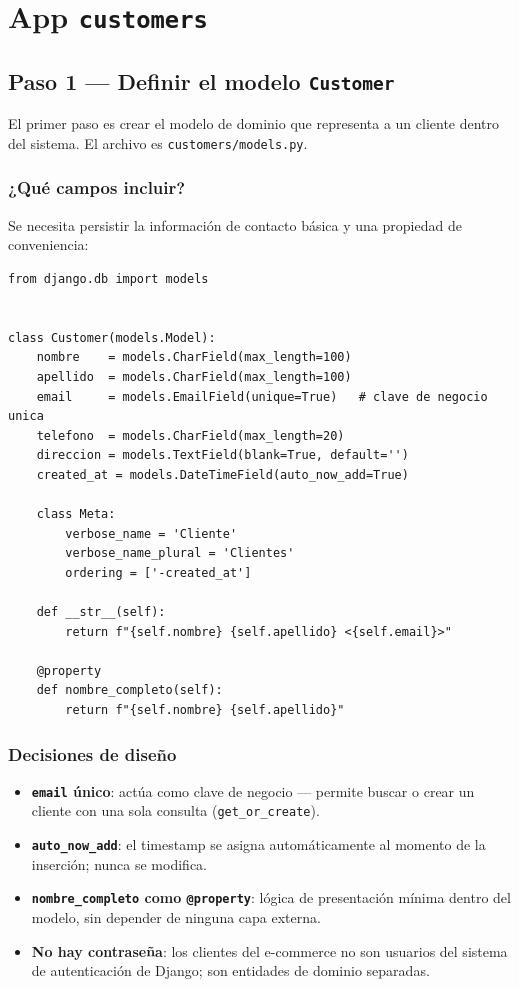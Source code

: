 \documentclass[12pt, a4paper]{article}
\begin{document}
\section{App \texttt{customers}}

\subsection{Paso 1 — Definir el modelo \texttt{Customer}}

El primer paso es crear el modelo de dominio que representa a un cliente dentro del sistema. El archivo es \texttt{customers/models.py}.

\subsubsection{¿Qué campos incluir?}

Se necesita persistir la información de contacto básica y una propiedad de conveniencia:

\begin{lstlisting}[caption={customers/models.py}]
from django.db import models


class Customer(models.Model):
    nombre    = models.CharField(max_length=100)
    apellido  = models.CharField(max_length=100)
    email     = models.EmailField(unique=True)   # clave de negocio unica
    telefono  = models.CharField(max_length=20)
    direccion = models.TextField(blank=True, default='')
    created_at = models.DateTimeField(auto_now_add=True)

    class Meta:
        verbose_name = 'Cliente'
        verbose_name_plural = 'Clientes'
        ordering = ['-created_at']

    def __str__(self):
        return f"{self.nombre} {self.apellido} <{self.email}>"

    @property
    def nombre_completo(self):
        return f"{self.nombre} {self.apellido}"
\end{lstlisting}

\subsubsection{Decisiones de diseño}

\begin{itemize}
    \item \textbf{\texttt{email} único}: actúa como clave de negocio — permite buscar o crear un cliente con una sola consulta (\texttt{get\_or\_create}).
    \item \textbf{\texttt{auto\_now\_add}}: el timestamp se asigna automáticamente al momento de la inserción; nunca se modifica.
    \item \textbf{\texttt{nombre\_completo} como \texttt{@property}}: lógica de presentación mínima dentro del modelo, sin depender de ninguna capa externa.
    \item \textbf{No hay contraseña}: los clientes del e-commerce no son usuarios del sistema de autenticación de Django; son entidades de dominio separadas.
\end{itemize}
\end{document}
